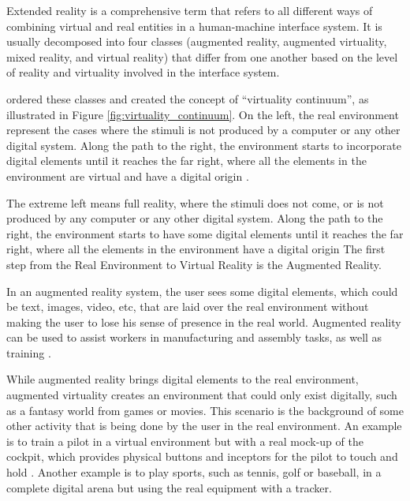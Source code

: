 Extended reality is a comprehensive term that refers to all different ways of combining virtual and real entities in a human-machine interface system. It is usually decomposed into four classes (augmented reality, augmented virtuality, mixed reality, and virtual reality) that differ from one another based on the level of reality and virtuality involved in the interface system. 

 ordered these classes and created the concept of “virtuality continuum”, as illustrated in Figure \ref{fig:virtuality_continuum}. On the left, the real environment represent the cases where the stimuli is not produced by a computer or any other digital system. Along the path to the right, the environment starts to incorporate digital elements until it reaches the far right, where all the elements in the environment are virtual and have a digital origin \cite{nijholt2005virtuality, doolani2020review}.



The extreme left means full reality, where the stimuli does not come, or is not produced by any computer or any other digital system. Along the path to the right, the environment starts to have some digital elements until it reaches the far right, where all the elements in the environment have a digital origin  The first step from the Real Environment to Virtual Reality is the Augmented Reality.

In an augmented reality system, the user sees some digital elements, which could be text, images, video, etc, that are laid over the real environment without making the user to lose his sense of presence in the real world. Augmented reality can be used to assist workers in manufacturing and assembly tasks, as well as training \cite{doolani2020review, farrell2018learning, ma2007virtuality}.
    
While augmented reality brings digital elements to the real environment, augmented virtuality creates an environment that could only exist digitally, such as a fantasy world from games or movies. This scenario is the background of some other activity that is being done by the user in the real environment. An example is to train a pilot in a virtual environment but with a real mock-up of the cockpit, which provides physical buttons and inceptors for the pilot to touch and hold \cite{farshid2018go}. Another example is to play sports, such as tennis, golf or baseball, in a complete digital arena but using the real equipment with a tracker.

